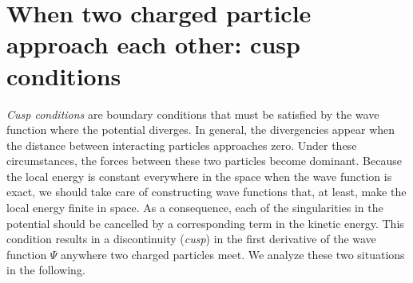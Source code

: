 \section{When two charged particle approach each other: cusp conditions}\label{cuspConditions}
\emph{Cusp conditions} are boundary conditions that must be satisfied by the wave function where the potential diverges. In general, the divergencies appear when the distance between in\-te\-rac\-ting particles approaches zero. Under these circumstances, the forces between these two particles become dominant. Because the local energy is constant everywhere in the space when the wave function is exact, we should take care of constructing wave functions that, at least, make the local energy finite in space. As a  consequence, each of the singularities in the potential should be cancelled by a corresponding term in the kinetic energy. This condition results in a discontinuity (\emph{cusp}) in the first derivative of the wave function $\Psi$ anywhere two charged particles meet. We analyze these two situations in the following.


